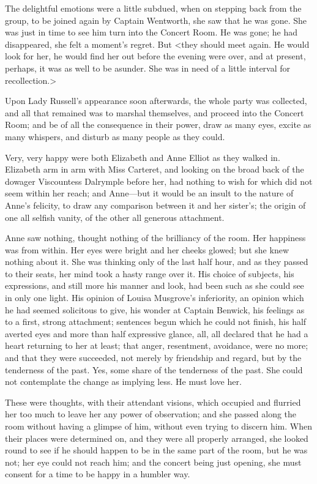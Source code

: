The delightful emotions were a little subdued, when on stepping back from the group, to be joined again by Captain Wentworth, she saw that he was gone. She was just in time to see him turn into the Concert Room. He was gone; he had disappeared, she felt a moment's regret. But <they should meet again. He would look for her, he would find her out before the evening were over, and at present, perhaps, it was as well to be asunder. She was in need of a little interval for recollection.>

Upon Lady Russell's appearance soon afterwards, the whole party was collected, and all that remained was to marshal themselves, and proceed into the Concert Room; and be of all the consequence in their power, draw as many eyes, excite as many whispers, and disturb as many people as they could.

Very, very happy were both Elizabeth and Anne Elliot as they walked in. Elizabeth arm in arm with Miss Carteret, and looking on the broad back of the dowager Viscountess Dalrymple before her, had nothing to wish for which did not seem within her reach; and Anne—but it would be an insult to the nature of Anne's felicity, to draw any comparison between it and her sister's; the origin of one all selfish vanity, of the other all generous attachment.

Anne saw nothing, thought nothing of the brilliancy of the room. Her happiness was from within. Her eyes were bright and her cheeks glowed; but she knew nothing about it. She was thinking only of the last half hour, and as they passed to their seats, her mind took a hasty range over it. His choice of subjects, his expressions, and still more his manner and look, had been such as she could see in only one light. His opinion of Louisa Musgrove's inferiority, an opinion which he had seemed solicitous to give, his wonder at Captain Benwick, his feelings as to a first, strong attachment; sentences begun which he could not finish, his half averted eyes and more than half expressive glance, all, all declared that he had a heart returning to her at least; that anger, resentment, avoidance, were no more; and that they were succeeded, not merely by friendship and regard, but by the tenderness of the past. Yes, some share of the tenderness of the past. She could not contemplate the change as implying less. He must love her.

These were thoughts, with their attendant visions, which occupied and flurried her too much to leave her any power of observation; and she passed along the room without having a glimpse of him, without even trying to discern him. When their places were determined on, and they were all properly arranged, she looked round to see if he should happen to be in the same part of the room, but he was not; her eye could not reach him; and the concert being just opening, she must consent for a time to be happy in a humbler way.


